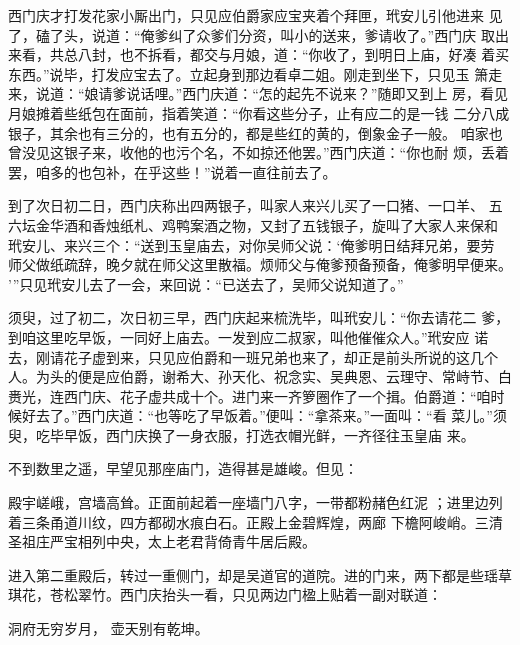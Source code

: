 西门庆才打发花家小厮出门，只见应伯爵家应宝夹着个拜匣，玳安儿引他进来
见了，磕了头，说道：“俺爹纠了众爹们分资，叫小的送来，爹请收了。”西门庆
取出来看，共总八封，也不拆看，都交与月娘，道：“你收了，到明日上庙，好凑
着买东西。”说毕，打发应宝去了。立起身到那边看卓二姐。刚走到坐下，只见玉
箫走来，说道：“娘请爹说话哩。”西门庆道：“怎的起先不说来？”随即又到上
房，看见月娘摊着些纸包在面前，指着笑道：“你看这些分子，止有应二的是一钱
二分八成银子，其余也有三分的，也有五分的，都是些红的黄的，倒象金子一般。
咱家也曾没见这银子来，收他的也污个名，不如掠还他罢。”西门庆道：“你也耐
烦，丢着罢，咱多的也包补，在乎这些！”说着一直往前去了。

到了次日初二日，西门庆称出四两银子，叫家人来兴儿买了一口猪、一口羊、
五六坛金华酒和香烛纸札、鸡鸭案酒之物，又封了五钱银子，旋叫了大家人来保和
玳安儿、来兴三个：“送到玉皇庙去，对你吴师父说：‘俺爹明日结拜兄弟，要劳
师父做纸疏辞，晚夕就在师父这里散福。烦师父与俺爹预备预备，俺爹明早便来。
’”只见玳安儿去了一会，来回说：“已送去了，吴师父说知道了。”

须臾，过了初二，次日初三早，西门庆起来梳洗毕，叫玳安儿：“你去请花二
爹，到咱这里吃早饭，一同好上庙去。一发到应二叔家，叫他催催众人。”玳安应
诺去，刚请花子虚到来，只见应伯爵和一班兄弟也来了，却正是前头所说的这几个
人。为头的便是应伯爵，谢希大、孙天化、祝念实、吴典恩、云理守、常峙节、白
赉光，连西门庆、花子虚共成十个。进门来一齐箩圈作了一个揖。伯爵道：“咱时
候好去了。”西门庆道：“也等吃了早饭着。”便叫：“拿茶来。”一面叫：“看
菜儿。”须臾，吃毕早饭，西门庆换了一身衣服，打选衣帽光鲜，一齐径往玉皇庙
来。

不到数里之遥，早望见那座庙门，造得甚是雄峻。但见：

殿宇嵯峨，宫墙高耸。正面前起着一座墙门八字，一带都粉赭色红泥
；进里边列着三条甬道川纹，四方都砌水痕白石。正殿上金碧辉煌，两廊
下檐阿峻峭。三清圣祖庄严宝相列中央，太上老君背倚青牛居后殿。

进入第二重殿后，转过一重侧门，却是吴道官的道院。进的门来，两下都是些瑶草
琪花，苍松翠竹。西门庆抬头一看，只见两边门楹上贴着一副对联道：

洞府无穷岁月，
壶天别有乾坤。

